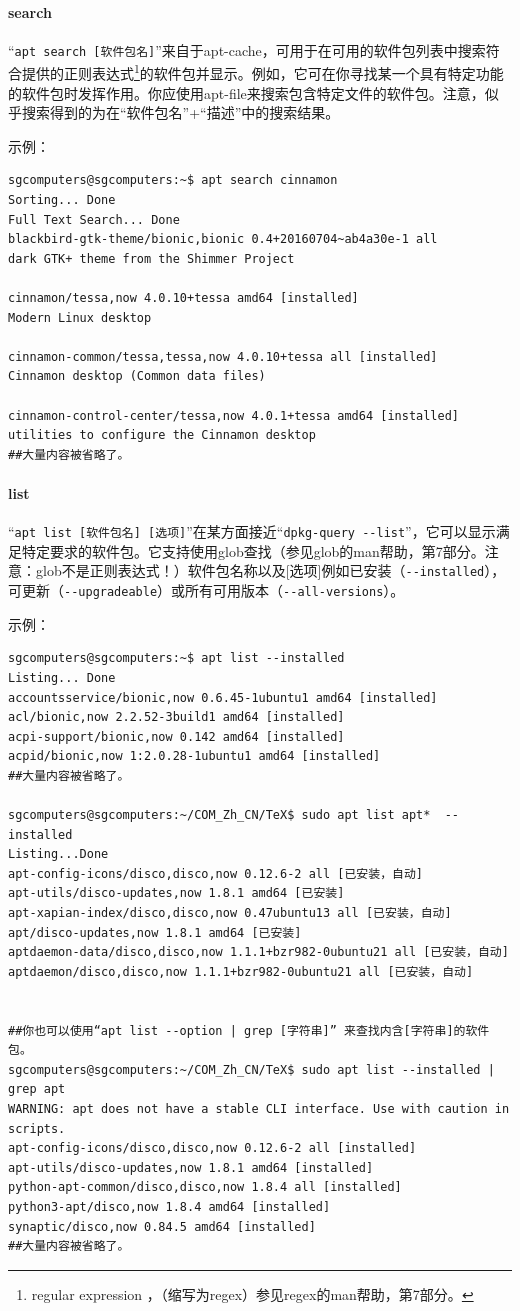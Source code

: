 \paragraph{search}
“\verb|apt search [软件包名]|”来自于apt-cache，可用于在可用的软件包列表中搜索符合提供的正则表达式\footnote{regular expression ，（缩写为regex）参见regex的man帮助，第7部分。}的软件包并显示。例如，它可在你寻找某一个具有特定功能的软件包时发挥作用。你应使用apt-file来搜索包含特定文件的软件包。注意，似乎搜索得到的为在“软件包名”+“描述”中的搜索结果。\par
示例：
\begin{verbatim}
sgcomputers@sgcomputers:~$ apt search cinnamon
Sorting... Done
Full Text Search... Done
blackbird-gtk-theme/bionic,bionic 0.4+20160704~ab4a30e-1 all
dark GTK+ theme from the Shimmer Project

cinnamon/tessa,now 4.0.10+tessa amd64 [installed]
Modern Linux desktop

cinnamon-common/tessa,tessa,now 4.0.10+tessa all [installed]
Cinnamon desktop (Common data files)

cinnamon-control-center/tessa,now 4.0.1+tessa amd64 [installed]
utilities to configure the Cinnamon desktop
##大量内容被省略了。
\end{verbatim}
\paragraph{list}
“\verb|apt list [软件包名] [选项]|”在某方面接近“\verb|dpkg-query --list|”，它可以显示满足特定要求的软件包。它支持使用glob查找（参见glob的man帮助，第7部分。注意：glob不是正则表达式！）软件包名称以及[选项]例如已安装（\verb|--installed|），可更新（\verb|--upgradeable|）或所有可用版本（\verb|--all-versions|）。\par
示例：
\begin{verbatim}
sgcomputers@sgcomputers:~$ apt list --installed
Listing... Done
accountsservice/bionic,now 0.6.45-1ubuntu1 amd64 [installed]
acl/bionic,now 2.2.52-3build1 amd64 [installed]
acpi-support/bionic,now 0.142 amd64 [installed]
acpid/bionic,now 1:2.0.28-1ubuntu1 amd64 [installed]
##大量内容被省略了。

sgcomputers@sgcomputers:~/COM_Zh_CN/TeX$ sudo apt list apt*  --installed 
Listing...Done
apt-config-icons/disco,disco,now 0.12.6-2 all [已安装，自动]
apt-utils/disco-updates,now 1.8.1 amd64 [已安装]
apt-xapian-index/disco,disco,now 0.47ubuntu13 all [已安装，自动]
apt/disco-updates,now 1.8.1 amd64 [已安装]
aptdaemon-data/disco,disco,now 1.1.1+bzr982-0ubuntu21 all [已安装，自动]
aptdaemon/disco,disco,now 1.1.1+bzr982-0ubuntu21 all [已安装，自动]


##你也可以使用“apt list --option | grep [字符串]” 来查找内含[字符串]的软件包。
sgcomputers@sgcomputers:~/COM_Zh_CN/TeX$ sudo apt list --installed | grep apt
WARNING: apt does not have a stable CLI interface. Use with caution in scripts.
apt-config-icons/disco,disco,now 0.12.6-2 all [installed]
apt-utils/disco-updates,now 1.8.1 amd64 [installed]
python-apt-common/disco,disco,now 1.8.4 all [installed]
python3-apt/disco,now 1.8.4 amd64 [installed]
synaptic/disco,now 0.84.5 amd64 [installed]
##大量内容被省略了。
\end{verbatim}
